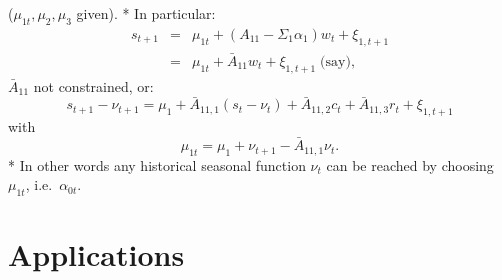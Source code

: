 \documentclass[
  12pt,
]{book}
\theoremstyle{definition}
\theoremstyle{definition}
\theoremstyle{definition}
\theoremstyle{definition}
\theoremstyle{remark}
\begin{document}
(\(\mu_{1t}, \mu_2, \mu_3\) given).
* In particular:
\begin{eqnarray*}
s_{t+1} & = & \mu_{1t} + (A_{11} - \Sigma_1 \alpha_1) w_t + \xi_{1,t+1} \\
& = & \mu_{1t} + \bar{A}_{11} w_t + \xi_{1,t+1}\; \mbox{(say)}, \;
\end{eqnarray*}
\(\bar{A}_{11}\) not constrained, or:
\[
s_{t+1} - \nu_{t+1} = \mu_1 + \bar{A}_{11,1} (s_t - \nu_t) + \bar{A}_{11,2} c_t + \bar{A}_{11,3} r_t + \xi_{1,t+1}
\]
with
\[
\mu_{1t} = \mu_1 + \nu_{t+1} - \bar{A}_{11,1} \nu_t.
\]
* In other words any historical seasonal function \(\nu_t\) can be reached by choosing \(\mu_{1t}\), i.e.~\(\alpha_{0t}\).

\hypertarget{FCFPApplications}{%
\section{Applications}\label{FCFPApplications}}
\end{document}

